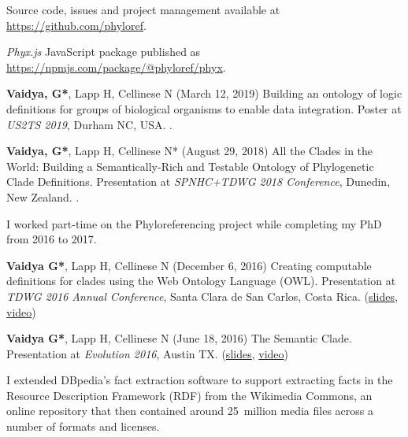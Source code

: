 \documentclass[12pt,letter]{article}
\begin{document}
\begin{publications}

\item Source code, issues and project management available at \url{https://github.com/phyloref}.

\item \textit{Phyx.js} JavaScript package published as \url{https://npmjs.com/package/@phyloref/phyx}.

\item \textbf{Vaidya, G*}, Lapp H, Cellinese N (March 12, 2019) Building an ontology of logic definitions for groups of biological organisms to enable data integration. Poster at \textit{US2TS 2019}, Durham NC, USA. .

\item \textbf{Vaidya, G*}, Lapp H, Cellinese N* (August 29, 2018) All the Clades in the World: Building a Semantically-Rich and Testable Ontology of Phylogenetic Clade Definitions. Presentation at \textit{SPNHC+TDWG 2018 Conference}, Dunedin, New Zealand. .

\end{publications}

I worked part-time on the Phyloreferencing project while completing my PhD from 2016 to 2017.

\begin{publications}

\item \textbf{Vaidya G*}, Lapp H, Cellinese N (December 6, 2016) Creating computable definitions for clades using the Web Ontology Language (OWL). Presentation at \textit{TDWG 2016 Annual Conference}, Santa Clara de San Carlos, Costa Rica. (\href{https://speakerdeck.com/gaurav/creating-computable-definitions-for-clades-using-the-web-ontology-language-owl}{slides}, \href{https://vimeo.com/198739085}{video})

\item \textbf{Vaidya G*}, Lapp H, Cellinese N (June 18, 2016) The Semantic Clade. Presentation at \textit{Evolution 2016}, Austin TX. (\href{https://speakerdeck.com/gaurav/the-semantic-clade}{slides}, \href{https://www.youtube.com/watch?v=_aNaAQYTNVc}{video})

\end{publications}


I extended \mbox{DBpedia's} fact extraction software to support extracting facts in the Resource Description Framework (RDF) from the Wikimedia Commons, an online repository that then contained around 25~million media files across a number of formats and licenses.
\end{document}
